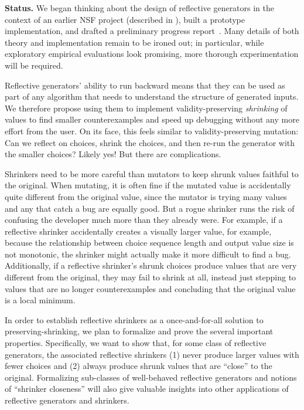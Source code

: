 \smallskip

{\bf Status.} We began thinking about the design of reflective
generators in the context of an earlier NSF project (described in
), built a prototype implementation, and drafted
a preliminary progress report~\cite{Frohlich2022}.  Many details of
both theory and implementation remain to be ironed out; in particular,
while exploratory empirical evaluations look promising, more thorough
experimentation will be required. 


%
Reflective generators' ability to run backward means that they can be used as
part of any algorithm that needs to understand the structure of generated
inputs.  We therefore propose using them to implement validity-preserving {\em
shrinking} of values to find smaller counterexamples and speed up debugging
without any more effort from the user. On its face, this feels similar to
validity-preserving mutation: Can we reflect on choices, shrink the choices, and
then re-run the generator with the smaller choices? Likely yes! But there are
complications.

Shrinkers need to be more careful than mutators to keep shrunk values faithful
to the original. When mutating, it is often fine if the mutated value is
accidentally quite different from the original value, since the mutator is
trying many values and any that catch a bug are equally good. But a rogue
shrinker runs the risk of confusing the developer much more than they already
were. For example, if a reflective shrinker accidentally creates a visually larger
value, for example, because the relationship between choice sequence length and
output value size is not monotonic, the shrinker might actually make it more
difficult to find a bug. Additionally, if a reflective shrinker's shrunk choices
produce values that are very different from the original, they may fail to
shrink at all, instead just stepping to values that are no longer
counterexamples and concluding that the original value is a local minimum.

In order to establish reflective shrinkers as a once-and-for-all solution to
 preserving-shrinking, we plan to formalize and prove the several
important
properties. Specifically, we want to show that, for some class of reflective
generators, the associated reflective shrinkers (1) never produce larger values
with fewer choices and (2) always produce shrunk values that are ``close'' to
the original. Formalizing sub-classes of well-behaved reflective generators and
notions of ``shrinker closeness'' will also give valuable insights into other
applications of reflective generators and shrinkers.

